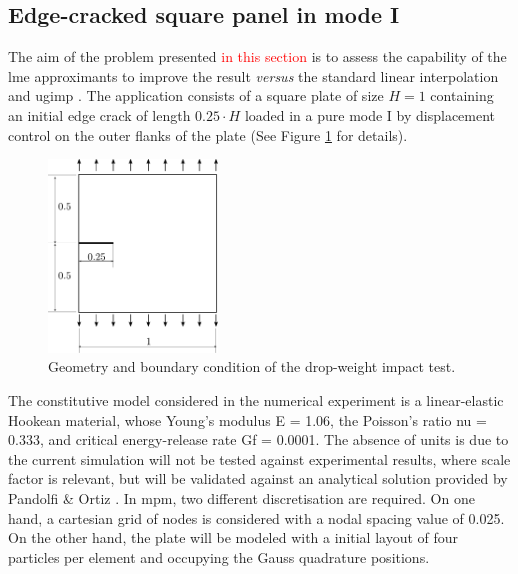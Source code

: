 \documentclass[preprint,12pt,a4paper]{elsarticle}
\begin{document}
\subsection{Edge-cracked square panel in mode I}
\label{sec:3.1}
The aim of the problem presented \textcolor{red}{in this section} is to assess the
capability of the \acrshort{lme} approximants to improve the result \textit{versus} the standard linear interpolation and \acrshort{ugimp}
\cite{Bardenhagen2004}. The application
consists of a square plate of size $H = 1$ containing an initial edge
crack of length $0.25 \cdot H$ loaded in a pure mode I by displacement
control on the outer flanks of the plate (See Figure
\ref{fig:geometry-cracked-panel-mode-I} for details). 
\begin{figure}
  \centering
  \includegraphics[width=0.4\textwidth]{Figure-Mode_I}
  \caption{Geometry and boundary condition of the drop-weight impact test.}
  \label{fig:geometry-cracked-panel-mode-I}
\end{figure}
The constitutive model considered in the numerical experiment is a
linear-elastic Hookean material, whose Young's modulus \gls{E} = 1.06, the Poisson's ratio \gls{nu} = 0.333, and
critical energy-release rate \gls{Gf} = 0.0001. The absence of units is due to the current
simulation will not be tested against experimental results, where scale factor is relevant, but will be validated against an analytical
solution provided by Pandolfi \& Ortiz \cite{Pandolfi_2012}. In \acrshort{mpm}, two different discretisation are required. On one
hand, a cartesian grid of nodes is considered with a nodal spacing value of 0.025. On the other hand, the plate will be modeled with a
initial layout of four particles per element and occupying the Gauss
quadrature positions.\\
\end{document}
